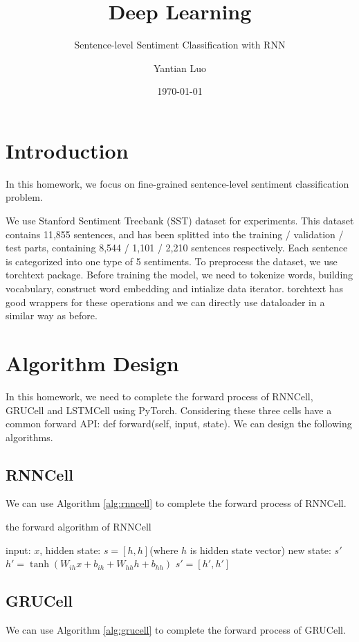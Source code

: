 \documentclass{elegantbook}
\title{Deep Learning}
\subtitle{Sentence-level Sentiment Classification with RNN}
\author{Yantian Luo}
\institute{Electronic Engineering}
\date{\today}
\begin{document}
\maketitle
\tableofcontents
\mainmatter
\hypersetup{pageanchor=true}
\chapter{Introduction}
In this homework, we focus on fine-grained sentence-level sentiment classification problem. 

We use Stanford Sentiment Treebank (SST) dataset for experiments. This dataset contains 11,855 sentences, and has been splitted into the training / validation / test parts, containing 8,544 / 1,101 / 2,210 sentences respectively. Each sentence is categorized into one type of 5 sentiments. To preprocess the dataset, we use torchtext package. Before training the model, we need to tokenize words, building vocabulary, construct word embedding and intialize data iterator. torchtext has good wrappers for these operations and we can directly use dataloader in a similar way as before.

\chapter{Algorithm Design}
In this homework, we need to complete the forward process of RNNCell, GRUCell and LSTMCell using PyTorch. Considering these three cells have a common forward API: def forward(self, input, state). We can design the following algorithms.

\section{RNNCell}
We can use Algorithm \ref{alg:rnncell} to complete the forward process of RNNCell.

\begin{algorithm}[H]
	\caption{\label{alg:rnncell}the forward algorithm of RNNCell}
	\begin{algorithmic}[1]
		\Require input: $x$, hidden state: $s=[h, h]$(where $h$ is hidden state vector)
		\Ensure new state: $s'$
		\State $h' = \tanh( W_{ih}x + b_{ih}  +  W_{hh} h + b_{hh})$
		\State \Return $s'=[h', h']$
	\end{algorithmic}
\end{algorithm}


\section{GRUCell}
We can use Algorithm \ref{alg:grucell} to complete the forward process of GRUCell.
\end{document}
